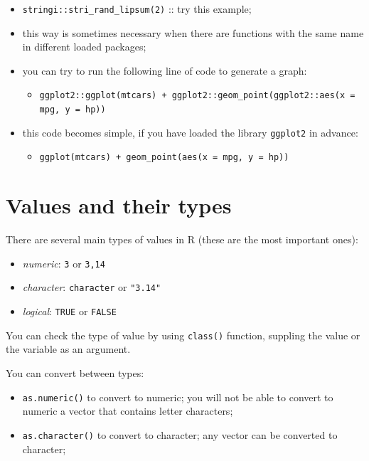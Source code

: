 \documentclass[
]{book}
\providecommand{\tightlist}{%
  \setlength{\itemsep}{0pt}\setlength{\parskip}{0pt}}
\begin{document}
\begin{itemize}
  \begin{itemize}
  \tightlist
  \item
    \texttt{stringi::stri\_rand\_lipsum(2)} :: try this example;
  \item
    this way is sometimes necessary when there are functions with the same name in different loaded packages;
  \item
    you can try to run the following line of code to generate a graph:

    \begin{itemize}
    \tightlist
    \item
      \texttt{ggplot2::ggplot(mtcars)\ +\ ggplot2::geom\_point(ggplot2::aes(x\ =\ mpg,\ y\ =\ hp))}
    \end{itemize}
  \item
    this code becomes simple, if you have loaded the library \texttt{ggplot2} in advance:

    \begin{itemize}
    \tightlist
    \item
      \texttt{ggplot(mtcars)\ +\ geom\_point(aes(x\ =\ mpg,\ y\ =\ hp))}
    \end{itemize}
  \end{itemize}
\end{itemize}

\hypertarget{values-and-their-types}{%
\section{Values and their types}\label{values-and-their-types}}

There are several main types of values in R (these are the most important ones):

\begin{itemize}
\tightlist
\item
  \emph{numeric}: \texttt{3} or \texttt{3,14}
\item
  \emph{character}: \texttt{character} or \texttt{"3.14"}
\item
  \emph{logical}: \texttt{TRUE} or \texttt{FALSE}
\end{itemize}

You can check the type of value by using \texttt{class()} function, suppling the value or the variable as an argument.

You can convert between types:

\begin{itemize}
\tightlist
\item
  \texttt{as.numeric()} to convert to numeric; you will not be able to convert to numeric a vector that contains letter characters;
\item
  \texttt{as.character()} to convert to character; any vector can be converted to character;
\end{itemize}
\end{document}
